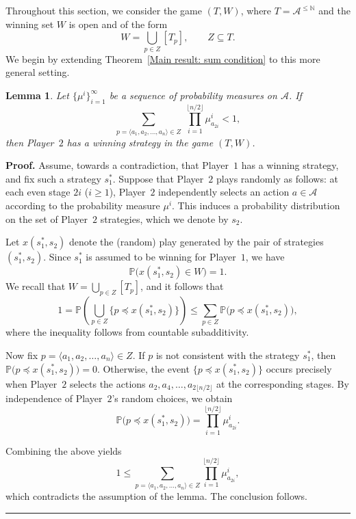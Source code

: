 \documentclass[a4,12pt]{article}%
\newtheorem{lemma}[theorem]{Lemma}
\newenvironment{proof}[1][Proof]{\textbf{#1.} }{\ \rule{0.5em}{0.5em}}
\begin{document}
Throughout this section, we consider the game $(T,W)$, where $T = \mathcal{A}^{\le \mathbb{N}}$ and the winning set $W$ is open and of the form
\[
W = \bigcup_{p \in Z} [T_p],
\qquad
Z \subseteq T.
\]
We begin by extending Theorem~\ref{Main result: sum condition} to this more general setting.

\begin{lemma}\label{countable main result - sums measure}
Let $\{\mu^i\}_{i=1}^\infty$ be a sequence of probability measures on $\mathcal{A}$. If
\[
\sum_{p = \langle a_1, a_2, \dots, a_n \rangle \in Z}
\;
\prod_{i=1}^{\lfloor n/2 \rfloor} \mu^i_{a_{2i}}
< 1,
\]
then Player~$2$ has a winning strategy in the game $(T,W)$.
\end{lemma}
\begin{proof}
Assume, towards a contradiction, that Player~$1$ has a winning strategy, and fix such a strategy $s_1^\ast$. Suppose that Player~$2$ plays randomly as follows: at each even stage $2i$ ($i \ge 1$), Player~$2$ independently selects an action $a \in \mathcal{A}$ according to the probability measure $\mu^i$. This induces a probability distribution on the set of Player~$2$ strategies, which we denote by $s_2$.

Let $x(s_1^\ast, s_2)$ denote the (random) play generated by the pair of strategies $(s_1^\ast, s_2)$. Since $s_1^\ast$ is assumed to be winning for Player~$1$, we have
\[
\mathbb{P}\bigl( x(s_1^\ast, s_2) \in W \bigr) = 1.
\]
We recall that $W = \bigcup_{p \in Z} [T_p]$, and
it follows that
\[
1
= \mathbb{P}\!\left( \bigcup_{p \in Z} \{ p \preceq x(s_1^\ast, s_2) \} \right)
\le
\sum_{p \in Z} \mathbb{P}\bigl( p \preceq x(s_1^\ast, s_2) \bigr),
\]
where the inequality follows from countable subadditivity.

Now fix $p = \langle a_1, a_2, \dots, a_n \rangle \in Z$. If $p$ is not consistent with the strategy $s_1^\ast$, then $\mathbb{P}\bigl( p \preceq x(s_1^\ast, s_2) \bigr) = 0$. Otherwise, the event $\{ p \preceq x(s_1^\ast, s_2) \}$ occurs precisely when Player~$2$ selects the actions $a_{2}, a_{4}, \dots, a_{2\lfloor n/2 \rfloor}$ at the corresponding stages. By independence of Player~$2$’s random choices, we obtain
\[
\mathbb{P}\bigl( p \preceq x(s_1^\ast, s_2) \bigr)
=
\prod_{i=1}^{\lfloor n/2 \rfloor} \mu^i_{a_{2i}}.
\]

Combining the above yields
\[
1
\le
\sum_{p = \langle a_1, a_2, \dots, a_n \rangle \in Z}
\prod_{i=1}^{\lfloor n/2 \rfloor} \mu^i_{a_{2i}},
\]
which contradicts the assumption of the lemma. The conclusion follows.
\end{proof}
\end{document}
